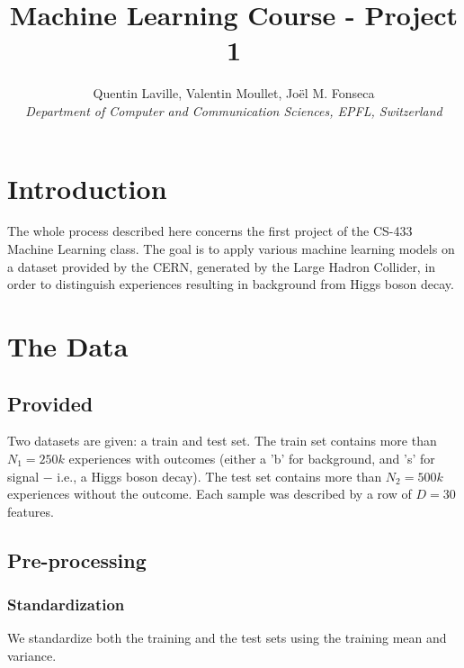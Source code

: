 \documentclass[10pt,conference,compsocconf]{IEEEtran}
\begin{document}
\title{Machine Learning Course - Project 1}

\author{
  Quentin Laville, Valentin Moullet, Joël M. Fonseca\\
  \textit{Department of Computer and Communication Sciences, EPFL, Switzerland}
}

\maketitle

\section{Introduction}

The whole process described here concerns the first project of the CS-433 Machine Learning class. The goal is to apply various machine learning models on a dataset provided by the CERN, generated by the Large Hadron Collider, in order to distinguish experiences resulting in background from Higgs boson decay.

\section{The Data}

\subsection{Provided}

Two datasets are given: a train and test set. The train set contains more than $N_1 = 250k$ experiences with outcomes (either a 'b' for background, and 's' for signal $-$ i.e., a Higgs boson decay). The test set contains more than $N_2 = 500k$ experiences without the outcome. Each sample was described by a row of $D = 30$ features.

\subsection{Pre-processing}

\subsubsection{Standardization}

We standardize both the training and the test sets using the training mean and variance.
\end{document}
